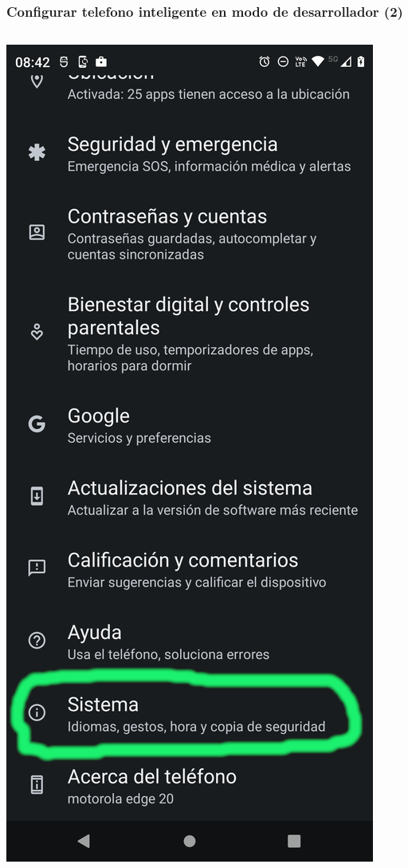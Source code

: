 \begin{frame}
\frametitle{Configurar telefono inteligente en modo de desarrollador (2)}  
\begin{columns}
\begin{center}
\includegraphics[width=0.95\linewidth]{01_Configurar/ModoDesarrollador5.png}    

\end{center}
\end{columns}
\end{frame}
